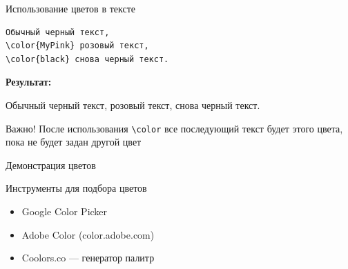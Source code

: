 \documentclass[aspectratio=169]{beamer}
\begin{document}
\begin{frame}[fragile]{Использование цветов в тексте}
    \begin{lstlisting}
Обычный черный текст, 
\color{MyPink} розовый текст, 
\color{black} снова черный текст.
    \end{lstlisting}
    
    \vspace{0.5cm}
    
    \textbf{Результат:}
    
    Обычный черный текст, \color{MyPink}розовый текст\color{black}, снова черный текст.
    
    \vspace{0.5cm}
    
    \begin{alertblock}{Важно!}
        После использования \texttt{\textbackslash color} все последующий текст будет этого цвета, пока не будет задан другой цвет
    \end{alertblock}
\end{frame}

\begin{frame}{Демонстрация цветов}
    \begin{center}
    \end{center}
    
    \vspace{0.5cm}
    
    \begin{block}{Инструменты для подбора цветов}
        \begin{itemize}
            \item Google Color Picker
            \item Adobe Color (color.adobe.com)
            \item Coolors.co — генератор палитр
        \end{itemize}
    \end{block}
\end{frame}
\end{document}
